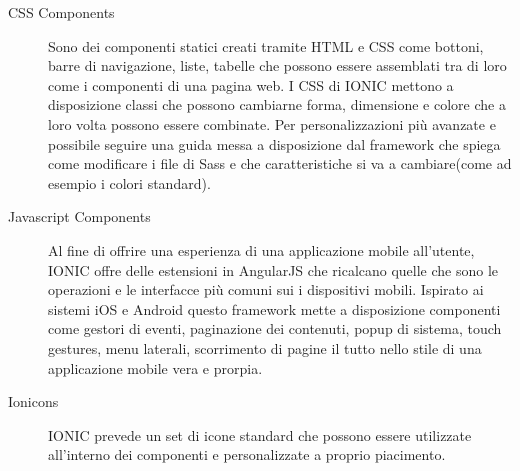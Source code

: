 \begin{description}

\item[CSS Components] Sono dei componenti statici creati tramite HTML e CSS come bottoni, barre di navigazione, liste, tabelle che possono essere assemblati tra di loro come i componenti di una pagina web. I CSS di IONIC mettono a disposizione classi che possono cambiarne forma, dimensione e colore che a loro volta possono essere combinate.
Per personalizzazioni più avanzate e possibile seguire una guida messa a disposizione dal framework che spiega come modificare i file di Sass e che caratteristiche si va a cambiare(come ad esempio i colori standard).

\item[Javascript Components] Al fine di offrire una esperienza di una applicazione mobile all'utente, IONIC offre delle estensioni in AngularJS che ricalcano quelle che sono le operazioni e le interfacce più comuni sui i dispositivi mobili. Ispirato ai sistemi iOS e Android questo framework mette a disposizione componenti come gestori di eventi, paginazione dei contenuti, popup di sistema, touch gestures, menu laterali, scorrimento di pagine il tutto nello stile di una applicazione mobile vera e prorpia.

\item[Ionicons] IONIC prevede un set di icone standard che possono essere utilizzate all'interno dei componenti e personalizzate a proprio piacimento.

\end{description} 

